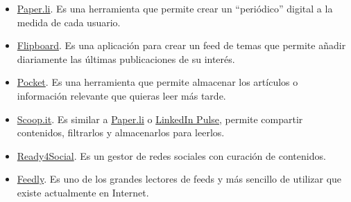 \begin{itemize}
    \item \href{https://paper.li/}{Paper.li}. Es una herramienta que permite crear un “periódico” digital a la  medida de cada usuario.
    \item \href{https://about.flipboard.com/}{Flipboard}. Es una aplicación para crear un feed de temas que permite añadir diariamente las últimas publicaciones de su interés.
    \item \href{https://getpocket.com}{Pocket}. Es una herramienta que permite almacenar los artículos o información relevante que quieras leer más tarde.
    \item \href{https://www.scoop.it}{Scoop.it}. Es similar a \href{https://paper.li}{Paper.li} o \href{https://www.exprimiendolinkedin.com/linkedin-pulse/}{LinkedIn Pulse}, permite compartir contenidos, filtrarlos y almacenarlos para leerlos.
    \item \href{https://www.ready4social.com}{Ready4Social}. Es un gestor de redes sociales con curación de contenidos.
    \item \href{https://feedly.com}{Feedly}. Es uno de los grandes lectores de feeds y más sencillo de utilizar que existe actualmente en Internet.
\end{itemize}